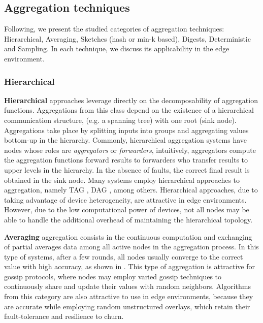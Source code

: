 \subsection{Aggregation techniques}

Following, we present the studied categories of aggregation techniques: Hierarchical, Averaging, Sketches (hash or min-k based), Digests, Deterministic and Sampling. In each technique, we discuss its applicability in the edge environment.

\subsubsection{Hierarchical}

\textbf{Hierarchical} approaches leverage directly on the decomposability of aggregation functions. Aggregations from this class depend on the existence of a hierarchical communication structure, (e.g. a spanning tree) with one root (sink node). Aggregations take place by splitting inputs into groups and aggregating values bottom-up in the hierarchy. Commonly, hierarchical aggregation systems have nodes whose roles are \textit{aggregators} or \textit{forwarders}, intuitively, aggregators compute the aggregation functions forward results to forwarders who transfer results to upper levels in the hierarchy. In the absence of faults, the correct final result is obtained in the sink node. Many systems employ hierarchical approaches to aggregation, namely TAG \cite{}, DAG \cite{}, among others. Hierarchical approaches, due to taking advantage of device heterogeneity, are attractive in edge environments. However, due to the low computational power of devices, not all nodes may be  able to handle the additional overhead of maintaining the hierarchical topology.

\textbf{Averaging} aggregation consists in the continuous computation and exchanging of partial averages data among all active nodes in the aggregation process. In this type of systems, after a few rounds, all nodes usually converge to the correct value with high accuracy, as shown in \cite{gossip_aggregation}. This type of aggregation is attractive for gossip protocols, where nodes may employ varied gossip techniques to continuously share and update their values with random neighbors. Algorithms from this category are also attractive to use in edge environments, because they are accurate while employing random unstructured overlays, which retain their fault-tolerance and resilience to churn.

